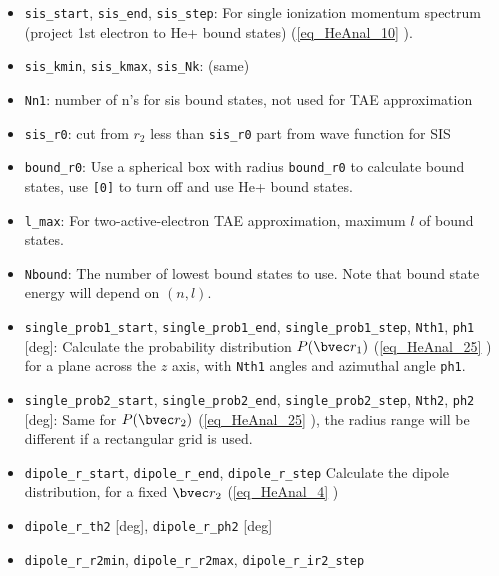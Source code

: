 \begin{itemize}
\item \verb`sis_start`, \verb`sis_end`, \verb`sis_step`: For single ionization momentum spectrum (project 1st electron to He+ bound states) (\autoref{eq_HeAnal_10} ).
\item \verb`sis_kmin`, \verb`sis_kmax`, \verb`sis_Nk`: (same)
\item \verb`Nn1`: number of n's for sis bound states, not used for TAE approximation
\item \verb`sis_r0`: cut from $r_2$ less than \verb`sis_r0` part from wave function for SIS
\item \verb`bound_r0`: Use a spherical box with radius \verb`bound_r0` to calculate bound states, use \verb|[0]| to turn off and use He+ bound states.
\item \verb`l_max`: For two-active-electron TAE approximation, maximum $l$ of bound states.
\item \verb`Nbound`: The number of lowest bound states to use. Note that bound state energy will depend on $(n, l)$.

\item \verb`single_prob1_start`, \verb`single_prob1_end`, \verb`single_prob1_step`, \verb`Nth1`, \verb`ph1` [deg]: Calculate the probability distribution $P(\bvec r_1)$ (\autoref{eq_HeAnal_25} ) for a plane across the $z$ axis, with \verb|Nth1| angles and azimuthal angle \verb|ph1|.

\item \verb`single_prob2_start`, \verb`single_prob2_end`, \verb`single_prob2_step`, \verb`Nth2`, \verb`ph2` [deg]: Same for $P(\bvec r_2)$ (\autoref{eq_HeAnal_25} ), the radius range will be different if a rectangular grid is used.
\item \verb`dipole_r_start`, \verb`dipole_r_end`, \verb`dipole_r_step` Calculate the dipole distribution, for a fixed $\bvec r_2$ (\autoref{eq_HeAnal_4} )
\item \verb`dipole_r_th2` [deg], \verb`dipole_r_ph2` [deg]
\item \verb`dipole_r_r2min`, \verb`dipole_r_r2max`, \verb`dipole_r_ir2_step`
\end{itemize}
